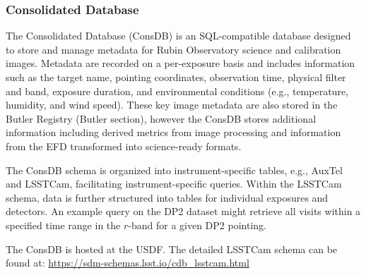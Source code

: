 \subsubsection{Consolidated Database}
\label{sssec:consdb}

The Consolidated Database (ConsDB) \citep[][]{DMTN-227} is an SQL-compatible database designed to store and manage metadata for Rubin Observatory science and calibration images.
Metadata are recorded on a per-exposure basis and includes information such as the target name, pointing coordinates, observation time, physical filter and band, exposure duration, and environmental conditions (e.g., temperature, humidity, and wind speed).
These key image metadata are also stored in the Butler Registry (Butler section), however the ConsDB stores additional information  including derived metrics from image processing and information from the EFD transformed into science-ready formats.

The ConsDB schema is organized into instrument-specific tables, e.g., AuxTel and \gls{LSSTCam}, facilitating instrument-specific queries.
Within the \gls{LSSTCam} schema, data is further structured into tables for individual exposures and detectors.
An example query on the \gls{DP2} dataset might retrieve all visits within a specified time range in the $r$-band for a given \gls{DP2} pointing.

The ConsDB is hosted at the \gls{USDF}.
The detailed \gls{LSSTCam} schema can be found at: \url{https://sdm-schemas.lsst.io/cdb_lsstcam.html}